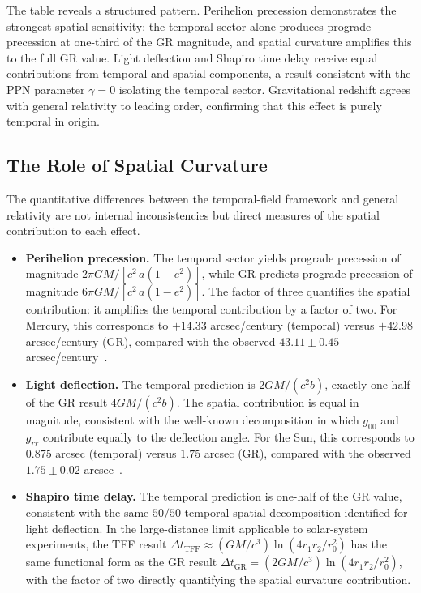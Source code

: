 \documentclass[12pt]{article}
\begin{document}
The table reveals a structured pattern. Perihelion precession demonstrates the strongest spatial sensitivity: the temporal sector alone produces prograde precession at one-third of the GR magnitude, and spatial curvature amplifies this to the full GR value. Light deflection and Shapiro time delay receive equal contributions from temporal and spatial components, a result consistent with the PPN parameter $\gamma = 0$ isolating the temporal sector. Gravitational redshift agrees with general relativity to leading order, confirming that this effect is purely temporal in origin.

\subsection{The Role of Spatial Curvature}
\label{sec:spatial_curvature}

The quantitative differences between the temporal-field framework and general relativity are not internal inconsistencies but direct measures of the spatial contribution to each effect.

\begin{itemize}
\item \textbf{Perihelion precession.}
The temporal sector yields prograde precession of magnitude $2\pi GM/[c^2\, a(1-e^2)]$, while GR predicts prograde precession of magnitude $6\pi GM/[c^2\, a(1-e^2)]$. The factor of three quantifies the spatial contribution: it amplifies the temporal contribution by a factor of two. For Mercury, this corresponds to $+14.33$ arcsec/century (temporal) versus $+42.98$ arcsec/century (GR), compared with the observed $43.11 \pm 0.45$ arcsec/century~\cite{Park2017}.

\item \textbf{Light deflection.}
The temporal prediction is $2GM/(c^2 b)$, exactly one-half of the GR result $4GM/(c^2 b)$. The spatial contribution is equal in magnitude, consistent with the well-known decomposition in which $g_{00}$ and $g_{rr}$ contribute equally to the deflection angle. For the Sun, this corresponds to $0.875$ arcsec (temporal) versus $1.75$ arcsec (GR), compared with the observed $1.75 \pm 0.02$ arcsec~\cite{Dyson1920}.

\item \textbf{Shapiro time delay.}
The temporal prediction is one-half of the GR value, consistent with the same $50/50$ temporal-spatial decomposition identified for light deflection. In the large-distance limit applicable to solar-system experiments, the TFF result $\Delta t_{\text{TFF}} \approx (GM/c^3)\ln(4r_1 r_2/r_0^2)$ has the same functional form as the GR result $\Delta t_{\text{GR}} = (2GM/c^3)\ln(4r_1 r_2/r_0^2)$, with the factor of two directly quantifying the spatial curvature contribution.
\end{itemize}
\end{document}
